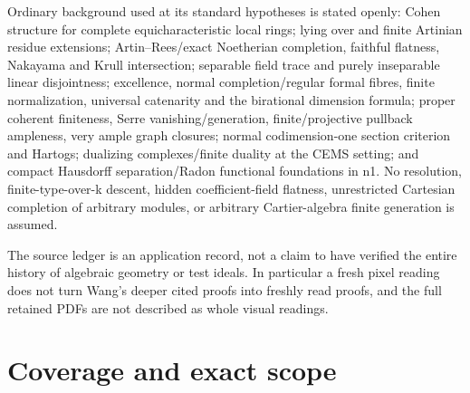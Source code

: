 \documentclass[11pt]{article}
\begin{document}
Ordinary background used at its standard hypotheses is stated openly: Cohen structure for complete equicharacteristic local rings; lying over and finite Artinian residue extensions; Artin--Rees/exact Noetherian completion, faithful flatness, Nakayama and Krull intersection; separable field trace and purely inseparable linear disjointness; excellence, normal completion/regular formal fibres, finite normalization, universal catenarity and the birational dimension formula; proper coherent finiteness, Serre vanishing/generation, finite/projective pullback ampleness, very ample graph closures; normal codimension-one section criterion and Hartogs; dualizing complexes/finite duality at the CEMS setting; and compact Hausdorff separation/Radon functional foundations in n1. No resolution, finite-type-over-k descent, hidden coefficient-field flatness, unrestricted Cartesian completion of arbitrary modules, or arbitrary Cartier-algebra finite generation is assumed.

The source ledger is an application record, not a claim to have verified the entire history of algebraic geometry or test ideals. In particular a fresh pixel reading does not turn Wang's deeper cited proofs into freshly read proofs, and the full retained PDFs are not described as whole visual readings.

\section{Coverage and exact scope}
\end{document}
